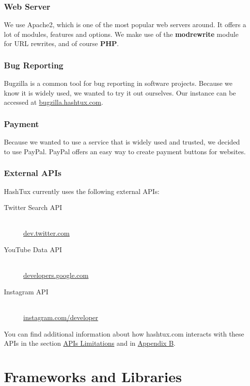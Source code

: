 \subsubsection{Web Server}
We use Apache2, which is one of the most popular web servers around. It offers a
lot of modules, features and options. We make use of the
\textbf{mod\textunderscore rewrite} module for URL rewrites, and of course
\textbf{PHP}.

\subsubsection{Bug Reporting}
Bugzilla is a common tool for bug reporting in software projects. Because we
know it is widely used, we wanted to try it out ourselves. Our instance can be
accessed at \href{http://bugzilla.hashtux.com}{bugzilla.hashtux.com}.

\subsubsection{Payment}
Because we wanted to use a service that is widely used and trusted, we decided
to use PayPal. PayPal offers an easy way to create payment buttons for websites.

\subsubsection{External APIs}
HashTux currently uses the following external APIs: \newline
\begin{description}
  \item[Twitter Search API] \hfill \\
  \href{https://dev.twitter.com/rest/public/search}{dev.twitter.com}
  \item[YouTube Data API] \hfill \\
  \href{https://developers.google.com/youtube/v3/}{developers.google.com}
  \item[Instagram API] \hfill \\
  \href{https://www.instagram.com/developer/}{instagram.com/developer}
\end{description}
You can find additional information about how hashtux.com interacts with these
APIs in the section \hyperlink{apilimits}{APIs Limitations} and in
\hyperlink{appendixb}{Appendix B}.

\section{Frameworks and Libraries}

